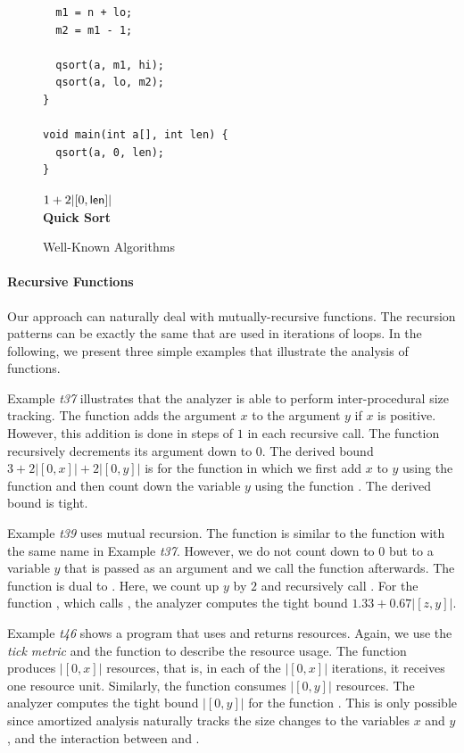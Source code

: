 \documentclass{sigplanconf}
\begin{document}
{\begin{figure}
\begin{minipage}[b]{\progwidth}
\begin{center}
\begin{lstlisting}
  m1 = n + lo;
  m2 = m1 - 1;

  qsort(a, m1, hi);
  qsort(a, lo, m2);
}

void main(int a[], int len) {
  qsort(a, 0, len);
}
   \end{lstlisting}

$1 + 2 |[0,\mathsf{len}]|$
\\[.7\baselineskip]
      {\bf Quick Sort}
    \end{center}
  \end{minipage}

   \caption{Well-Known Algorithms}
  \label{fig:cat3}
\end{figure}





\paragraph{Recursive Functions}

Our approach can naturally deal with mutually-recursive functions.
The recursion patterns can be exactly the same that are used in
iterations of loops.  In the following, we present three simple
examples that illustrate the analysis of functions.

Example \emph{t37} illustrates that the analyzer is able to perform
inter-procedural size tracking.  The function  adds the
argument $x$ to the argument $y$ if $x$ is positive.  However, this
addition is done in steps of $1$ in each recursive call.  The function
 recursively decrements its argument down to $0$.
The derived bound $3 + 2|[0, x]| +2|[0, y]|$ is for the function
 in which we first add $x$ to $y$ using the function
 and then count down the variable $y$ using the function
.  The derived bound is tight.

Example \emph{t39} uses mutual recursion.  The function
 is similar to the function with the same name in
Example \emph{t37}.  However, we do not count down to $0$ but to a
variable $y$ that is passed as an argument and we call the function
 afterwards.  The function  is dual to
.  Here, we count up $y$ by $2$ and recursively call
.  For the function , which calls
, the analyzer computes the tight bound $1.33 +
0.67 |[z,y]|$.

Example \emph{t46} shows a program that uses and returns resources.
Again, we use the \emph{tick metric} and the function  to
describe the resource usage.  The function  produces
$|[0,x]|$ resources, that is, in each of the $|[0,x]|$ iterations, it
receives one resource unit.  Similarly, the function 
consumes $|[0,y]|$ resources.  The analyzer computes the tight bound
$|[0,y]|$ for the function .  This is only possible since
amortized analysis naturally tracks the size changes to the variables
$x$ and $y$, and the interaction between  and
.


}
\end{document}
